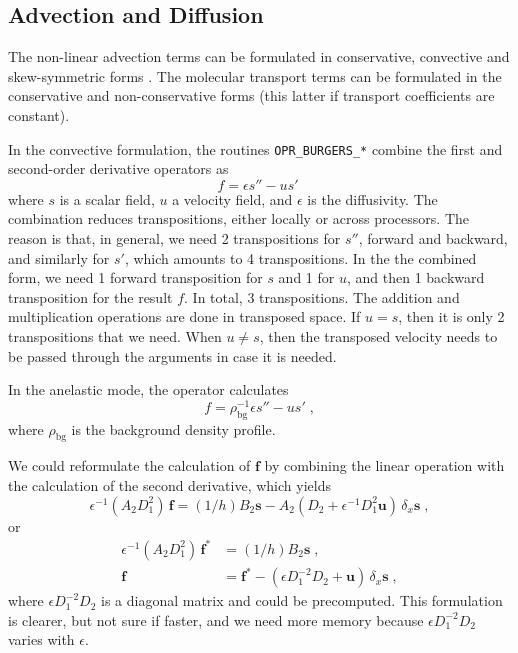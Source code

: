 \subsection{Advection and Diffusion}

The non-linear advection terms can be formulated in conservative, convective and skew-symmetric forms \citep{Blaisdell:1996,Kravchenko:1997}. The molecular transport terms can be formulated in the conservative and non-conservative forms (this latter if transport coefficients are constant).

In the convective formulation, the routines {\tt OPR\_BURGERS\_*} combine the first and second-order derivative operators as
\begin{equation}
f=\epsilon s'' - u s'\;
\end{equation}
where $s$ is a scalar field, $u$ a velocity field, and $\epsilon$ is the diffusivity. The combination reduces transpositions, either locally or across processors. The reason is that, in general, we need 2 transpositions for $s''$, forward and backward, and similarly for $s'$, which amounts to 4 transpositions. In the the combined form, we need 1 forward transposition for $s$ and 1 for $u$, and then 1 backward transposition for the result $f$. In total, 3 transpositions. The addition and multiplication operations are done in transposed space. If $u= s$, then it is only 2 transpositions that we need. When $u\ne s$, then the transposed velocity needs to be passed through the arguments in case it is needed.

In the anelastic mode, the operator calculates
\begin{equation}
f=\rho_\mathrm{bg}^{-1}\epsilon s'' - u s'\;,
\end{equation}
where $\rho_\mathrm{bg}$ is the background density profile.

We could reformulate the calculation of $\mathbf{f}$ by combining the linear operation with the calculation of the second derivative, which yields
\begin{equation}
    \epsilon^{-1}(A_2D_1^2)\, \mathbf{f}=(1/h)B_2 \mathbf{s}
    - A_2(D_2 + \epsilon^{-1}D_1^2\mathbf{u})\,\delta_x  \mathbf{s} \;,
\end{equation}
or
\begin{subequations}
  \begin{align}
    \epsilon^{-1}(A_2D_1^2)\, \mathbf{f}^*&=(1/h)B_2 \mathbf{s} \;,\\
    \mathbf{f}&= \mathbf{f}^*- (\epsilon D_1^{-2}D_2 + \mathbf{u})\,\delta_x  \mathbf{s} \;,
  \end{align}
\end{subequations}
where $\epsilon D_1^{-2}D_2$ is a diagonal matrix and could be precomputed. This formulation is clearer, but not sure if faster, and we need more memory because $\epsilon D_1^{-2}D_2$ varies with $\epsilon$.


